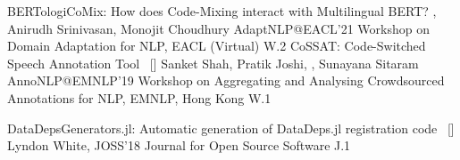 \begin{publications}
	
\publication
    {BERTologiCoMix: How does Code-Mixing interact with Multilingual BERT?}{}
    {\underline{}, Anirudh Srinivasan, Monojit Choudhury}
	{AdaptNLP@EACL'21} {Workshop on Domain Adaptation for NLP, EACL (Virtual)} {W.2}
\publication
	{CoSSAT: Code-Switched Speech Annotation Tool}{~ [\href{https://www.aclweb.org/anthology/D19-5907/}{\small{\linkSymbol}}]}
	{Sanket Shah, Pratik Joshi, \underline{}, Sunayana Sitaram}
	{AnnoNLP@EMNLP'19} {Workshop on Aggregating and Analysing Crowdsourced Annotations for NLP, EMNLP, Hong Kong} {W.1}


\publication
	{DataDepsGenerators.jl: Automatic generation of DataDeps.jl registration code}{~ [\href{https://joss.theoj.org/papers/10.21105/joss.00921}{\small{\linkSymbol}}]}
	{Lyndon White, \underline{}}
	{JOSS'18} {Journal for Open Source Software} {J.1}
	
\end{publications}

\vspace{-3mm}